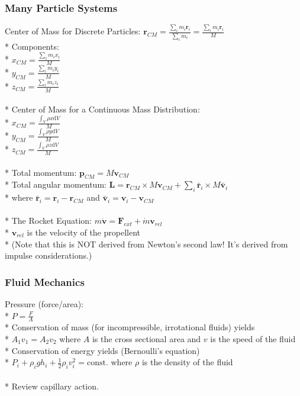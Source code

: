 \subsubsection{Many Particle Systems}
Center of Mass for Discrete Particles: \(\displaystyle \mathbf{r}_{CM}=\frac{\sum_{i} m_i\mathbf{r}_i}{\sum_{i} m_i}=\frac{\sum_{i} m_i\mathbf{r}_i}{M}\)\\*
Components:\\*
\(x_{CM}=\frac{\sum_{i} m_i x_i}{M}\)\\*
\(y_{CM}=\frac{\sum_{i} m_i y_i}{M}\)\\*
\(z_{CM}=\frac{\sum_{i} m_i z_i}{M}\)\\\\*
 Center of Mass for a Continuous Mass Distribution:\\*
 \(x_{CM}=\frac{\int_{V} \rho x\mathrm{d}V}{M}\)\\*
 \(y_{CM}=\frac{\int_{V} \rho y\mathrm{d}V}{M}\)\\*
 \(z_{CM}=\frac{\int_{V} \rho z\mathrm{d}V}{M}\)\\\\*
 Total momentum: \(\mathbf{p}_{CM}=M\mathbf{v}_{CM}\)\\*
 Total angular momentum: \(\displaystyle\mathbf{L}=\mathbf{r}_{CM}\times M\mathbf{v}_{CM} + \sum_{i}\bar{\mathbf{r}}_i \times M\bar{\mathbf{v}}_i\)\\*
 where \(\bar{\mathbf{r}}_i = \mathbf{r}_i-\mathbf{r}_{CM}\) and \(\bar{\mathbf{v}}_i = \mathbf{v}_i-\mathbf{v}_{CM}\)\\\\*
 The Rocket Equation: \(m\dot{\mathbf{v}}=\mathbf{F}_{ext}+\dot{m}\mathbf{v}_{rel}\)\\*
 \(\mathbf{v}_{rel}\) is the velocity of the propellent\\*
 (Note that this is NOT derived from Newton's second law! It's derived from impulse considerations.)

\subsubsection{Fluid Mechanics}
Pressure (force/area):\\*
\(P=\frac{F}{A}\)\\*
Conservation of mass (for incompressible, irrotational fluids) yields\\*
\(A_1v_1=A_2v_2\) where \(A\) is the cross sectional area and \(v\) is the speed of the fluid\\*
Conservation of energy yields (Bernoulli's equation)\\*
\(P_i+\rho_igh_i+\frac{1}{2}\rho_iv_i^2=\mathrm{const.}\) where \(\rho\) is the density of the fluid\\\\*
Review capillary action.

